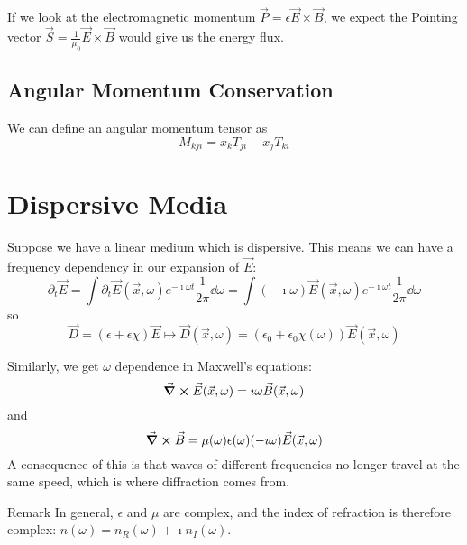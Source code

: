\documentclass[a4paper,twoside,master.tex]{subfiles}
\begin{document}
If we look at the electromagnetic momentum $ \vec{P} = \epsilon \vec{E} \times \vec{B} $, we expect the Pointing vector $ \vec{S} = \frac{1}{\mu_0} \vec{E} \times \vec{B} $ would give us the energy flux.

\subsection{Angular Momentum Conservation}
\label{sub:angular_momentum_conservation}

We can define an angular momentum tensor as
\begin{equation}
    M_{kji} = x_k T_{ji} - x_j T_{ki}
\end{equation}

\section{Dispersive Media}
\label{sec:dispersive_media}
Suppose we have a linear medium which is dispersive. This means we can have a frequency dependency in our expansion of $ \vec{E} $:
\begin{equation}
    \partial_t \vec{E} = \int \partial_t \vec{E}( \vec{x}, \omega) e^{-\imath \omega t} \frac{1}{2 \pi} \dd{\omega} = \int (-\imath\omega) \vec{E}( \vec{x}, \omega) e^{-\imath\omega t} \frac{1}{2 \pi} \dd{\omega} 
\end{equation}
so
\begin{equation}
    \vec{D} = (\epsilon + \epsilon \chi) \vec{E} \mapsto \vec{D}( \vec{x}, \omega) = (\epsilon_0 + \epsilon_0 \chi(\omega)) \vec{E}( \vec{x}, \omega)
\end{equation}

Similarly, we get $\omega$ dependence in Maxwell's equations:
\begin{equation}
    \curl{ \vec{E}} ( \vec{x}, \omega) = \imath \omega \vec{B}( \vec{x}, \omega)
\end{equation}
and
\begin{equation}
    \curl{ \vec{B}} = \mu(\omega) \epsilon(\omega) (-\imath\omega) \vec{E}( \vec{x}, \omega)
\end{equation}
A consequence of this is that waves of different frequencies no longer travel at the same speed, which is where diffraction comes from.
\begin{note}{Remark}
    In general, $\epsilon$ and $\mu$ are complex, and the index of refraction is therefore complex: $ n(\omega) = n_R(\omega) + \imath n_I(\omega) $.
\end{note}
\end{document}
